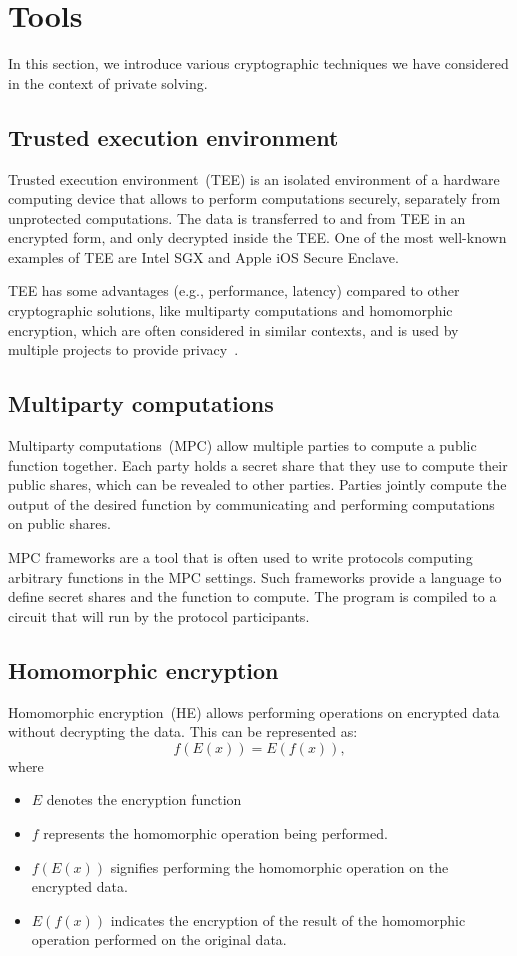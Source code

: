 \documentclass[
    9pt,            %
    report,        %
    affiltop,       %
]{art}
\begin{document}
\section{Tools}\label{tools}

In this section, we introduce various cryptographic techniques we have considered in the context of private solving. 

\subsection{Trusted execution environment}\label{TEE}

Trusted execution environment~(TEE) is an isolated environment of a
hardware computing device that allows to perform computations securely,
separately from unprotected computations. The data is transferred to and from
TEE in an encrypted form, and only decrypted inside the TEE. One of the most
well-known examples of TEE are Intel SGX and Apple iOS Secure Enclave. 

TEE has some advantages (e.g., performance, latency) compared to other cryptographic solutions, like multiparty computations and homomorphic encryption, which are often considered in similar contexts, and is used by multiple projects to provide privacy~\citep{flash,secret}.

\subsection{Multiparty computations}\label{MPC}

Multiparty computations~(MPC) allow multiple parties to compute a public function together. Each party holds a secret share that they use to compute their public shares, which can be revealed to other parties. Parties jointly compute the output of the desired function by communicating and performing computations on public shares.

MPC frameworks are a tool that is often used to write protocols computing arbitrary functions in the MPC settings. Such frameworks provide a language to define secret shares and the function to compute. The program is compiled to a circuit that will run by the protocol participants.

\subsection{Homomorphic encryption}\label{HE}

Homomorphic encryption~(HE) allows performing operations on encrypted data without decrypting the data. This can be represented as: 
$$f(E(x)) = E(f(x)),$$ 
where
\begin{itemize}
\item $E$ denotes the encryption function
\item $f$ represents the homomorphic operation being performed.
\item $f(E(x))$ signifies performing the homomorphic operation on the encrypted data.
\item $E(f(x))$ indicates the encryption of the result of the homomorphic operation performed on the original data.
\end{itemize}
\end{document}
